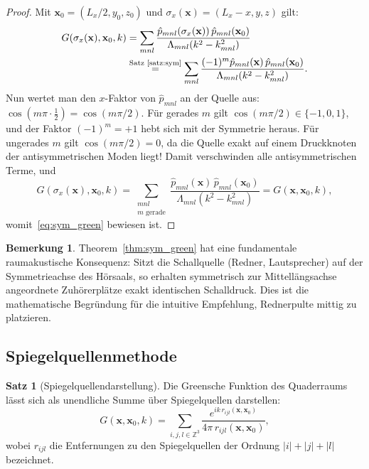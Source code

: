 ﻿\documentclass[12pt, a4paper]{article}
\theoremstyle{definition}
\newtheorem{satz}{Satz}[section]
\newtheorem{bemerkung}{Bemerkung}[section]
\theoremstyle{remark}
\newcommand{\Lx}{L_x}
\begin{document}
\begin{proof}
Mit $\mathbf{x}_0 = (\Lx/2, y_0, z_0)$ und $\sigma_x(\mathbf{x}) = (\Lx-x, y, z)$ gilt:
\begin{align*}
  G(\sigma_x(\mathbf{x}),\mathbf{x}_0,k)
  &= \sum_{mnl} \frac{\hat{p}_{mnl}(\sigma_x(\mathbf{x}))\,\hat{p}_{mnl}(\mathbf{x}_0)}
                    {\Lambda_{mnl}(k^2-k_{mnl}^2)} \\
  &\overset{\text{Satz~\ref{satz:sym}}}{=}
    \sum_{mnl} \frac{(-1)^m \hat{p}_{mnl}(\mathbf{x})\,\hat{p}_{mnl}(\mathbf{x}_0)}
                    {\Lambda_{mnl}(k^2-k_{mnl}^2)}.
\end{align*}
Nun wertet man den $x$-Faktor von $\hat{p}_{mnl}$ an der Quelle aus:
$\cos(m\pi \cdot \frac{1}{2}) = \cos(m\pi/2)$.
Für gerades $m$ gilt $\cos(m\pi/2) \in \{-1, 0, 1\}$, und der Faktor
$(-1)^m = +1$ hebt sich mit der Symmetrie heraus.
Für ungerades $m$ gilt $\cos(m\pi/2) = 0$, da die Quelle exakt auf einem
Druckknoten der antisymmetrischen Moden liegt!
Damit verschwinden alle antisymmetrischen Terme, und
\[
  G(\sigma_x(\mathbf{x}),\mathbf{x}_0,k)
  = \sum_{\substack{mnl \\ m \text{ gerade}}}
    \frac{\hat{p}_{mnl}(\mathbf{x})\,\hat{p}_{mnl}(\mathbf{x}_0)}{\Lambda_{mnl}(k^2-k_{mnl}^2)}
  = G(\mathbf{x},\mathbf{x}_0,k),
\]
womit~\eqref{eq:sym_green} bewiesen ist. 
\end{proof}

\begin{bemerkung}
Theorem~\ref{thm:sym_green} hat eine fundamentale raumakustische Konsequenz:
Sitzt die Schallquelle (Redner, Lautsprecher) auf der Symmetrieachse des Hörsaals,
so erhalten symmetrisch zur Mittellängsachse angeordnete Zuhörerplätze exakt
identischen Schalldruck. Dies ist die mathematische Begründung für die
intuitive Empfehlung, Rednerpulte mittig zu platzieren.
\end{bemerkung}

\subsection{Spiegelquellenmethode}

\begin{satz}[Spiegelquellendarstellung]
\label{satz:spiegelquellen}
Die Greensche Funktion des Quaderraums lässt sich als unendliche Summe
über Spiegelquellen darstellen:
\begin{equation}
  G(\mathbf{x},\mathbf{x}_0,k)
  = \sum_{i,j,l \in \mathbb{Z}^3}
    \frac{e^{ik\,r_{ijl}(\mathbf{x},\mathbf{x}_0)}}{4\pi\,r_{ijl}(\mathbf{x},\mathbf{x}_0)},
  \label{eq:spiegelquellen}
\end{equation}
wobei $r_{ijl}$ die Entfernungen zu den Spiegelquellen der Ordnung $|i|+|j|+|l|$
bezeichnet.
\end{satz}
\end{document}
